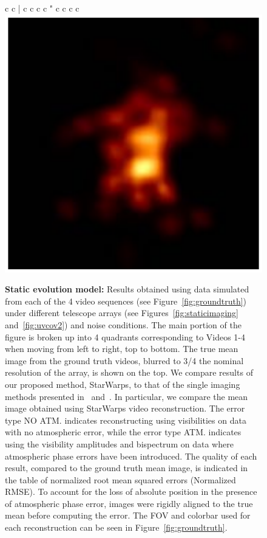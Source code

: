 \begin{figure}
\begin{center}
\begin{tabular}{  c c | c  c  c  c "  c  c  c  c  }
			\includegraphics[height=.1\linewidth]{figures/starwarps_results/hotakamovie_45/ehtfuture1_100_compare/none_amp-clphase_blur025.pdf} 
			\\ 
		\end{tabular}
		\caption{\scriptsize{\bf Static evolution model:} Results obtained using data simulated from each of the 4 video sequences (see Figure~\ref{fig:groundtruth}) under different telescope arrays (see Figures~\ref{fig:staticimaging} and~\ref{fig:uvcov2}) and noise conditions. The main portion of the figure is broken up into 4 quadrants corresponding to Videos 1-4 when moving from left to right, top to bottom. The true mean image from the ground truth videos, blurred to 3/4 the nominal resolution of the array, is shown on the top. We compare results of our proposed method, StarWarps, to that of the single imaging methods presented in~\cite{freek} and~\cite{andrew}. In particular, we compare the mean image obtained using StarWarps video reconstruction. The error type NO ATM. indicates reconstructing using visibilities on data with no atmospheric error, while the error type ATM. indicates using the visibility amplitudes and bispectrum on data where atmospheric phase errors have been introduced. The quality of each result, compared to the ground truth mean image, is indicated in the table of normalized root mean squared errors (Normalized RMSE). To account for the loss of absolute position in the presence of atmospheric phase error, images were rigidly aligned to the true mean before computing the error. The FOV and colorbar used for each reconstruction can be seen in Figure~\ref{fig:groundtruth}. }
		\label{fig:staticevolutionresults}
	\end{center}
\end{figure}




























































